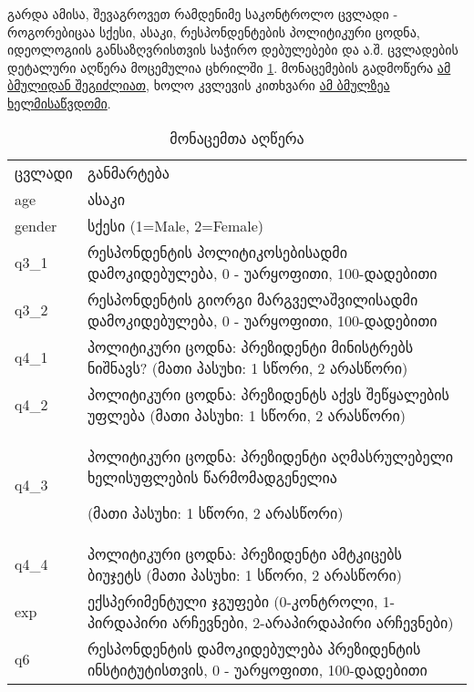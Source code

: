 \documentclass{article}\usepackage[]{graphicx}\usepackage[]{color}
\begin{document}
გარდა ამისა, შევაგროვეთ რამდენიმე საკონტროლო ცვლადი - როგორებიცაა სქესი, ასაკი, რესპონდენტების პოლიტიკური ცოდნა, იდეოლოგიის განსაზღვრისთვის საჭირო დებულებები და ა.შ. ცვლადების დეტალური აღწერა მოცემულია ცხრილში \ref{tabledef}. მონაცემების გადმოწერა \href{https://www.dropbox.com/s/zzfcpdikndexgcy/data.csv?dl=0}{ამ ბმულიდან შეგიძლიათ}, ხოლო კვლევის კითხვარი \href{https://docs.google.com/document/d/1lH15h1pGd8dTW5zlvbfhM5mnLKELn-cCK9vpTnfVJ1w/edit?usp=sharing}{ამ ბმულზეა ხელმისაწვდომი}.

\begin{table}[]
\centering
\caption{მონაცემთა აღწერა}
\label{tabledef}
\begin{tabular}{ll}
ცვლადი & განმარტება                                                                                                 \\
age    & ასაკი                                                                                                      \\
gender & სქესი (1=Male, 2=Female)                                                                                   \\
q3\_1  & რესპონდენტის პოლიტიკოსებისადმი დამოკიდებულება, 0 - უარყოფითი, 100-დადებითი                                 \\
q3\_2  & რესპონდენტის გიორგი მარგველაშვილისადმი დამოკიდებულება, 0 - უარყოფითი, 100-დადებითი                         \\
q4\_1  & პოლიტიკური ცოდნა: პრეზიდენტი მინისტრებს ნიშნავს? (მათი პასუხი: 1 სწორი, 2 არასწორი)                        \\
q4\_2  & პოლიტიკური ცოდნა: პრეზიდენტს აქვს შეწყალების უფლება (მათი პასუხი: 1 სწორი, 2 არასწორი)                     \\
q4\_3  & პოლიტიკური ცოდნა: პრეზიდენტი აღმასრულებელი ხელისუფლების წარმომადგენელია\begin{minipage}{2in}{(მათი პასუხი: 1 სწორი, 2 არასწორი)}\end{minipage} \\
q4\_4  & პოლიტიკური ცოდნა: პრეზიდენტი ამტკიცებს ბიუჯეტს (მათი პასუხი: 1 სწორი, 2 არასწორი)                          \\
exp    & ექსპერიმენტული ჯგუფები (0-კონტროლი, 1-პირდაპირი არჩევნები, 2-არაპირდაპირი არჩევნები)                       \\
q6     & რესპონდენტის დამოკიდებულება პრეზიდენტის ინსტიტუტისთვის, 0 - უარყოფითი, 100-დადებითი                       
\end{tabular}
\end{table}
\end{document}
